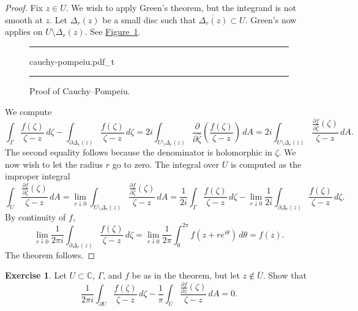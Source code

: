 \documentclass[12pt,openany]{book}
\newcommand{\C}{{\mathbb{C}}}
\theoremstyle{plain}
\theoremstyle{remark}
\theoremstyle{definition}
\newenvironment{exbox}{%
    \def\FrameCommand{\vrule width 1pt \relax\hspace {10pt}}%
    \MakeFramed {\advance \hsize -\width \FrameRestore }%
}{%
    \endMakeFramed
}
\newenvironment{myfig}{%
\begin{figure}[h!t]
\noindent\rule{\textwidth}{0.4pt}\vspace{12pt}\par\centering}%
{\par\noindent\rule{\textwidth}{0.4pt}
\end{figure}}
\theoremstyle{exercise}
\newtheorem{exercise}{Exercise}[section]
\theoremstyle{example}
\newcommand{\figureref}[1]{\hyperref[#1]{Figure~\ref*{#1}}}
\begin{document}
\begin{proof}
Fix $z \in U$.  We wish to apply Green's theorem,
but the integrand is not smooth at $z$.
Let $\Delta_r(z)$ be a small disc such that
$\overline{\Delta_r(z)} \subset U$.  Green's now applies on $U \setminus \Delta_r(z)$.  See
\figureref{fig:cauchypompeiu}.

\begin{myfig}
{cauchy-pompeiu.pdf_t}
\caption{Proof of Cauchy--Pompeiu.\label{fig:cauchypompeiu}}
\end{myfig}

We compute
\begin{equation*}
\int_{\Gamma} \frac{f(\zeta)}{\zeta-z}\,  d\zeta - 
\int_{\partial \Delta_r(z)} \frac{f(\zeta)}{\zeta-z}\,  d\zeta
=
2i
\int_{U \setminus \Delta_r(z)} \frac{\partial}{\partial \bar{\zeta}} \left(
\frac{f(\zeta)}{\zeta-z} \right) \, dA
=
2i
\int_{U \setminus \Delta_r(z)}  
\frac{\frac{\partial f}{\partial \bar{\zeta}}(\zeta)}{\zeta-z} \, dA .
\end{equation*}
The second equality follows because the denominator is holomorphic in
$\zeta$.
We now wish to let the radius $r$ go to zero.
The integral over $U$ is computed as the improper integral
\begin{equation*}
\int_{U} \frac{\frac{\partial f}{\partial
\bar{\zeta}}(\zeta)}{\zeta-z} \, dA
=
\lim_{r \downarrow 0}
\int_{U \setminus \Delta_r(z)} \frac{\frac{\partial f}{\partial
\bar{\zeta}}(\zeta)}{\zeta-z} \, dA
=
\frac{1}{2i}
\int_{\Gamma} \frac{f(\zeta)}{\zeta-z}\,  d\zeta
- 
\lim_{r \downarrow 0}
\frac{1}{2i}
\int_{\partial \Delta_r(z)} \frac{f(\zeta)}{\zeta-z}\,  d\zeta .
\end{equation*}
By continuity of $f$,
\begin{equation*}
\lim_{r \downarrow 0}
\frac{1}{2\pi i}
\int_{\partial \Delta_r(z)} \frac{f(\zeta)}{\zeta-z}\,  d\zeta
=
\lim_{r \downarrow 0}
\frac{1}{2\pi}
\int_0^{2\pi} f(z + r e^{i\theta})\, d\theta
=
f(z) .
\end{equation*}
The theorem follows.
\end{proof}

\begin{exbox}
\begin{exercise}
Let $U \subset \C$, $\Gamma$, and $f$ be as in the theorem, but let $z \notin
\overline{U}$.  Show that
\begin{equation*}
\frac{1}{2\pi i}
\int_{\partial U}
\frac{f(\zeta)}{\zeta-z}
\,
d \zeta
-
\frac{1}{\pi}
\int_{U}
\frac{\frac{\partial f}{\partial \bar{z}}(\zeta)}{\zeta-z}
\,
dA
= 0 .
\end{equation*}
\end{exercise}
\end{exbox}
\end{document}
